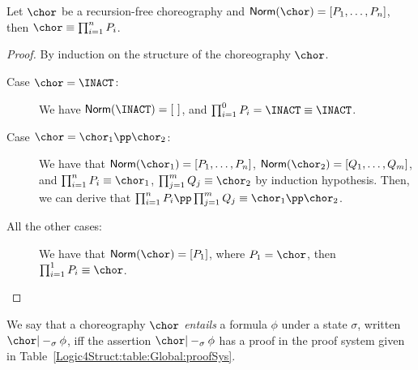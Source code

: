 \begin{lemma}
  \label{Logic4Struct:lem:normalisation}
  Let $\chor$ be a recursion-free choreography and
  $\textsf{Norm}(\chor) = [P_1,\dots,P_n]$, then $\chor \equiv
  \prod_{i=1}^n P_i$.
\end{lemma}
\begin{proof}
  By induction on the structure of the choreography $\chor$.
   \begin{description}
   \item[Case $\chor = \INACT$:] We have $\textsf{Norm}(\INACT) = [\
     ]$, and $\prod_{i=1}^0 P_i = \INACT \equiv \INACT$.
   \item[Case $\chor = \chor_1 \pp \chor_2$:] We have that
     $\textsf{Norm}(\chor_1) = [P_1,\dots,P_n]$,
     $\textsf{Norm}(\chor_2) = [Q_1,\dots,Q_m]$, and $\prod_{i=1}^n P_i
     \equiv \chor_1$, $\prod_{j=1}^m Q_j \equiv \chor_2$ by induction
     hypothesis. Then, we can derive that $\prod_{i=1}^n P_i \pp
     \prod_{j=1}^m Q_j \equiv \chor_1 \pp \chor_2$.
   \item[All the other cases:] We have that
     $\textsf{Norm}(\chor) = [P_1]$, where $P_1 = \chor$, then
     $\prod_{i=1}^1 P_i \equiv \chor$. 
   \end{description}
\end{proof}

\begin{definition}[Entailment]
  We say that a choreography $\chor$ \emph{entails} a formula $\phi$
  under a state $\sigma$, written $\chor|-_\sigma \phi$, iff the
  assertion $\chor|-_\sigma \phi$ has a proof in the proof system
  given in Table~\ref{Logic4Struct:table:Global:proofSys}.
\end{definition}

